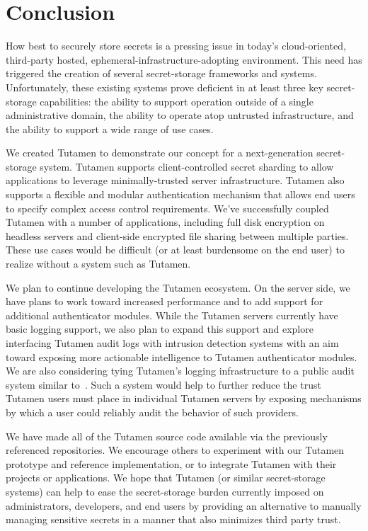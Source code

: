 \section{Conclusion}
\label{sec:conclusion}

How best to securely store secrets is a pressing issue in today's
cloud-oriented, third-party hosted, ephemeral-infrastructure-adopting
environment. This need has triggered the creation of several
secret-storage frameworks and systems. Unfortunately, these existing
systems prove deficient in at least three key secret-storage
capabilities: the ability to support operation outside of a single
administrative domain, the ability to operate atop untrusted
infrastructure, and the ability to support a wide range of use cases.

We created Tutamen to demonstrate our concept for a next-generation
secret-storage system. Tutamen supports client-controlled secret
sharding to allow applications to leverage minimally-trusted server
infrastructure. Tutamen also supports a flexible and modular
authentication mechanism that allows end users to specify complex
access control requirements. We've successfully coupled Tutamen with a
number of applications, including full disk encryption on headless
servers and client-side encrypted file sharing between multiple
parties. These use cases would be difficult (or at least burdensome on
the end user) to realize without a system such as Tutamen.

We plan to continue developing the Tutamen ecosystem. On the server
side, we have plans to work toward increased performance and to add
support for additional authenticator modules. While the Tutamen
servers currently have basic logging support, we also plan to expand
this support and explore interfacing Tutamen audit logs with intrusion
detection systems with an aim toward exposing more actionable
intelligence to Tutamen authenticator modules. We are also considering
tying Tutamen's logging infrastructure to a public audit system
similar to~\cite{laurie2013}. Such a system would help to further
reduce the trust Tutamen users must place in individual Tutamen
servers by exposing mechanisms by which a user could reliably audit
the behavior of such providers.

We have made all of the Tutamen source code available via the
previously referenced repositories. We encourage others to experiment
with our Tutamen prototype and reference implementation, or to
integrate Tutamen with their projects or applications. We hope that
Tutamen (or similar secret-storage systems) can help to ease the
secret-storage burden currently imposed on administrators, developers,
and end users by providing an alternative to manually managing
sensitive secrets in a manner that also minimizes third party trust.

